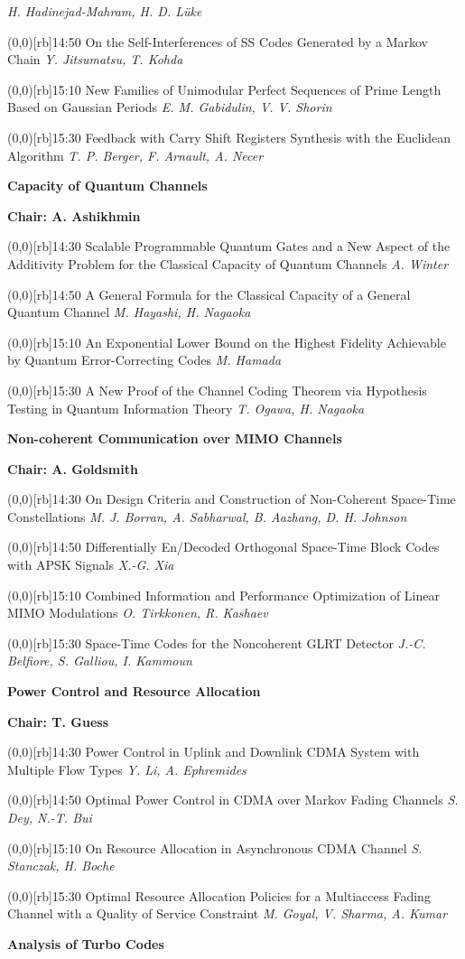 \documentclass[a5paper,twoside]{article}
\def\period#1{\flushleft{\large\bfseries #1}\markboth{\sf #1}{\sf #1}}
\def\sesstitle#1{\vspace{.45\bigskipamount}\par{\bfseries #1}\par}
\def\sesschair#1{{\bfseries Chair: #1}\par\vspace{.65\medskipamount}}
\def\papertime#1{\makebox(0,0)[rb]{{\scriptsize #1}\hspace{.5em}}}
\def\papertitle#1{#1\hfil\break}
\def\paperauthors#1{{\itshape #1}\par\filbreak\vspace{.65\medskipamount}}
\begin{document}
\paperauthors{H. Hadinejad-Mahram, H. D. L\"uke}
\papertime{14:50}%
\papertitle{On the Self-Interferences of SS Codes Generated by a Markov Chain}
\paperauthors{Y. Jitsumatsu, T. Kohda}
\papertime{15:10}%
\papertitle{New Families of Unimodular Perfect Sequences of Prime Length Based on Gaussian Periods}
\paperauthors{E. M. Gabidulin, V. V. Shorin}
\papertime{15:30}%
\papertitle{Feedback with Carry Shift Registers Synthesis with the Euclidean Algorithm}
\paperauthors{T. P. Berger, F. Arnault, A. Necer}
\sesstitle{Capacity of Quantum Channels}
\sesschair{A. Ashikhmin}
\papertime{14:30}%
\papertitle{Scalable Programmable Quantum Gates and a New Aspect of the Additivity Problem for the Classical Capacity of Quantum Channels}
\paperauthors{A. Winter}
\papertime{14:50}%
\papertitle{A General Formula for the Classical Capacity of a General Quantum Channel}
\paperauthors{M. Hayashi, H. Nagaoka}
\papertime{15:10}%
\papertitle{An Exponential Lower Bound on the Highest Fidelity Achievable by Quantum Error-Correcting Codes}
\paperauthors{M. Hamada}
\papertime{15:30}%
\papertitle{A New Proof of the Channel Coding Theorem via Hypothesis Testing in Quantum Information Theory}
\paperauthors{T. Ogawa, H. Nagaoka}
\sesstitle{Non-coherent Communication over MIMO Channels}
\sesschair{A. Goldsmith}
\papertime{14:30}%
\papertitle{On Design Criteria and Construction of Non-Coherent Space-Time Constellations}
\paperauthors{M. J. Borran, A. Sabharwal, B. Aazhang, D. H. Johnson}
\papertime{14:50}%
\papertitle{Differentially En/Decoded Orthogonal Space-Time Block Codes with APSK Signals}
\paperauthors{X.-G. Xia}
\papertime{15:10}%
\papertitle{Combined Information and Performance Optimization of Linear MIMO Modulations}
\paperauthors{O. Tirkkonen, R. Kashaev}
\papertime{15:30}%
\papertitle{Space-Time Codes for the Noncoherent GLRT Detector}
\paperauthors{J.-C. Belfiore, S. Galliou, I. Kammoun}
\sesstitle{Power Control and Resource Allocation}
\sesschair{T. Guess}
\papertime{14:30}%
\papertitle{Power Control in Uplink and Downlink CDMA System with Multiple Flow Types}
\paperauthors{Y. Li, A. Ephremides}
\papertime{14:50}%
\papertitle{Optimal Power Control in CDMA over Markov Fading Channels}
\paperauthors{S. Dey, N.-T. Bui}
\papertime{15:10}%
\papertitle{On Resource Allocation in Asynchronous CDMA Channel}
\paperauthors{S. Stanczak, H. Boche}
\papertime{15:30}%
\papertitle{Optimal Resource Allocation Policies for a Multiaccess Fading Channel with a Quality of Service Constraint}
\paperauthors{M. Goyal, V. Sharma, A. Kumar}
\period{Mon 16:10 -- 17:50}
\sesstitle{Analysis of Turbo Codes}
\end{document}
